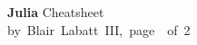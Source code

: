 \documentclass[10pt,landscape]{article}
\newcommand{\header}{
\begin{mdframed}[]
\footnotesize
\sffamily
\Large{\textbf{Julia}} \footnotesize Cheatsheet\\
by~Blair~Labatt~III,~page~\thepage~of~2
\end{mdframed}
}
\begin{document}
\small
\begin{multicols*}{4}
\header









%
%



\vfil\,


\end{multicols*}
\end{document}
